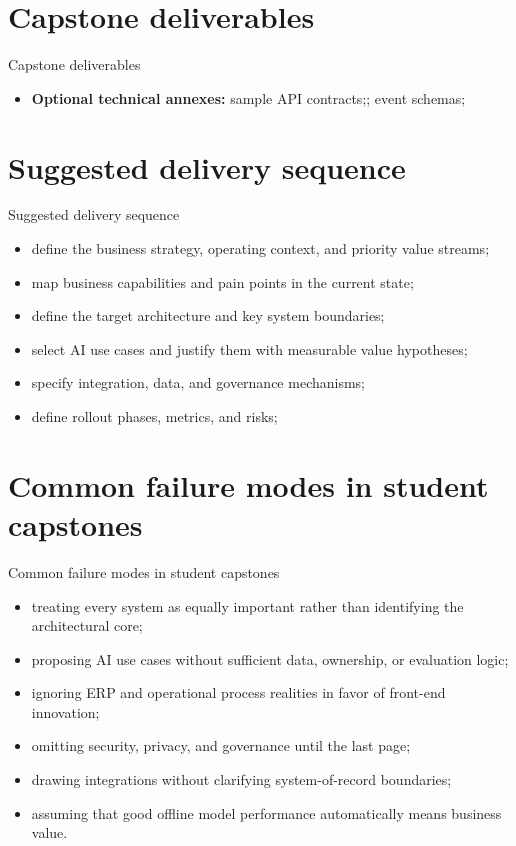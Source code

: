 \documentclass[aspectratio=169]{beamer}
\begin{document}
\section{Capstone deliverables}

\begin{frame}{Capstone deliverables}
  \begin{itemize}
    \item \textbf{Optional technical annexes:} sample API contracts;; event schemas;
  \end{itemize}
\end{frame}

\section{Suggested delivery sequence}

\begin{frame}{Suggested delivery sequence}
  \begin{itemize}
    \item define the business strategy, operating context, and priority value streams;
    \item map business capabilities and pain points in the current state;
    \item define the target architecture and key system boundaries;
    \item select AI use cases and justify them with measurable value hypotheses;
    \item specify integration, data, and governance mechanisms;
    \item define rollout phases, metrics, and risks;
  \end{itemize}
\end{frame}

\section{Common failure modes in student capstones}

\begin{frame}{Common failure modes in student capstones}
  \begin{itemize}
    \item treating every system as equally important rather than identifying the architectural core;
    \item proposing AI use cases without sufficient data, ownership, or evaluation logic;
    \item ignoring ERP and operational process realities in favor of front-end innovation;
    \item omitting security, privacy, and governance until the last page;
    \item drawing integrations without clarifying system-of-record boundaries;
    \item assuming that good offline model performance automatically means business value.
  \end{itemize}
\end{frame}
\end{document}
